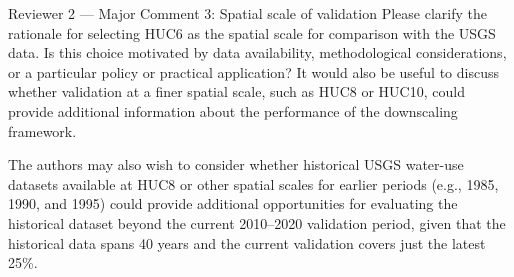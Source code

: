 \documentclass[11pt,letterpaper]{article}
\begin{document}
\begin{commentbox}[label={r2:maj3}]{Reviewer 2 --- Major Comment 3: Spatial scale of validation}
Please clarify the rationale for selecting HUC6 as the spatial scale for comparison with the USGS data. Is this choice motivated by data availability, methodological considerations, or a particular policy or practical application? It would also be useful to discuss whether validation at a finer spatial scale, such as HUC8 or HUC10, could provide additional information about the performance of the downscaling framework.

The authors may also wish to consider whether historical USGS water-use datasets available at HUC8 or other spatial scales for earlier periods (e.g., 1985, 1990, and 1995) could provide additional opportunities for evaluating the historical dataset beyond the current 2010--2020 validation period, given that the historical data spans 40 years and the current validation covers just the latest 25\%.
\end{commentbox}
\end{document}
